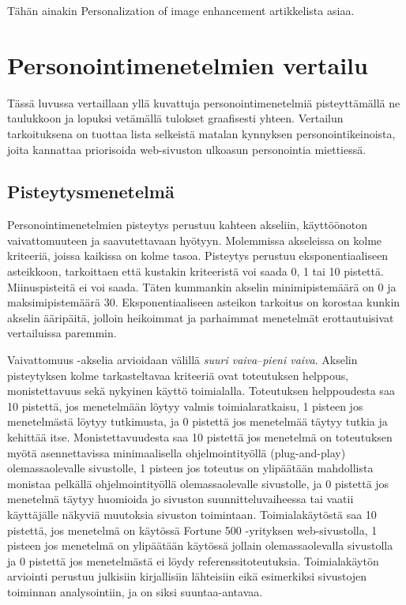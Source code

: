 \documentclass[finnish, 12pt, a4paper, elec, utf8, a-1b, online]{aaltothesis}
\begin{document}
Tähän ainakin Personalization of image enhancement artikkelista asiaa.

\clearpage

\section{Personointimenetelmien vertailu}

Tässä luvussa vertaillaan yllä kuvattuja personointimenetelmiä pisteyttämällä ne
taulukkoon ja lopuksi vetämällä tulokset graafisesti yhteen. Vertailun
tarkoituksena on tuottaa lista selkeistä matalan kynnyksen personointikeinoista,
joita kannattaa priorisoida web-sivuston ulkoasun personointia miettiessä.

\subsection{Pisteytysmenetelmä}

Personointimenetelmien pisteytys perustuu kahteen akseliin, käyttöönoton
vaivattomuuteen ja saavutettavaan hyötyyn. Molemmissa akseleissa on kolme
kriteeriä, joissa kaikissa on kolme tasoa. Pisteytys perustuu eksponentiaaliseen
asteikkoon, tarkoittaen että kustakin kriteeristä voi saada 0, 1 tai 10
pistettä. Miinuspisteitä ei voi saada. Täten kummankin akselin minimipistemäärä
on 0 ja maksimipistemäärä 30. Eksponentiaaliseen asteikon tarkoitus on korostaa
kunkin akselin ääripäitä, jolloin heikoimmat ja parhaimmat menetelmät
erottautuisivat vertailuissa paremmin.

Vaivattomuus -akselia arvioidaan välillä \textit{suuri vaiva}--\textit{pieni
    vaiva}. Akselin pisteytyksen kolme tarkasteltavaa kriteeriä ovat toteutuksen
helppous, monistettavuus sekä nykyinen käyttö toimialalla. Toteutuksen
helppoudesta saa 10 pistettä, jos menetelmään löytyy valmis toimialaratkaisu, 1
pisteen jos menetelmästä löytyy tutkimusta, ja 0 pistettä jos menetelmää täytyy
tutkia ja kehittää itse. Monistettavuudesta saa 10 pistettä jos menetelmä on
toteutuksen myötä asennettavissa minimaalisella ohjelmointityöllä
(plug-and-play) olemassaolevalle sivustolle, 1 pisteen jos toteutus on
ylipäätään mahdollista monistaa pelkällä ohjelmointityöllä olemassaolevalle
sivustolle, ja 0 pistettä jos menetelmä täytyy huomioida jo sivuston
suunnitteluvaiheessa tai vaatii käyttäjälle näkyviä muutoksia sivuston
toimintaan. Toimialakäytöstä saa 10 pistettä, jos menetelmä on käytössä Fortune
500 -yrityksen web-sivustolla, 1 pisteen jos menetelmä on ylipäätään käytössä
jollain olemassaolevalla sivustolla ja 0 pistettä jos menetelmästä ei löydy
referenssitoteutuksia. Toimialakäytön arviointi perustuu julkisiin kirjallisiin
lähteisiin eikä esimerkiksi sivustojen toiminnan analysointiin, ja on siksi
suuntaa-antavaa.
\end{document}
